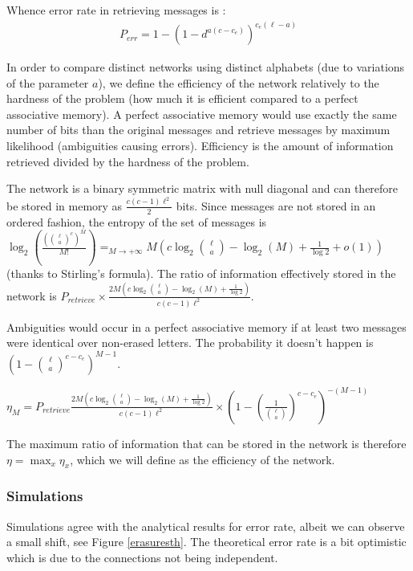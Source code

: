 \documentclass[english,10pt,twocolumn]{IEEEtran}
\theoremstyle{definition}
\begin{document}
	Whence error rate in retrieving messages is : 
	\begin{align}	
		P_{err} = 1 - \left(1 - d^	{a(c-c_e)}\right)^{c_e(\ell-a)} 
	\end{align}	 
	
	In order to compare distinct networks using distinct alphabets (due to variations of the parameter $a$), we define the efficiency of the network relatively to the hardness of the problem (how much it is efficient compared to a perfect associative memory). A perfect associative memory would use exactly the same number of bits than the original messages and retrieve messages by maximum likelihood (ambiguities causing errors). Efficiency is the amount of information retrieved divided by the hardness of the problem.
	
	The network is a binary symmetric matrix with null diagonal and can therefore be stored in memory as $\frac{c(c-1) \ell^2}{2}$ bits. Since messages are not stored in an ordered fashion, the entropy of the set of messages is $\log_2(\frac{({\ell \choose a}^c)^M}{M!}) \mathop{=}_{M \rightarrow +\infty} M(c \log_2{\ell \choose a } - \log_2(M) + \frac{1}{\log 2} + o(1)) $ (thanks to  Stirling's formula). The ratio of information effectively stored in the network is $P_{retrieve} \times  \frac{2M \left(c \log_2{\ell \choose a } - \log_2(M) + \frac{1}{\log 2} \right)}{c(c-1)\ell^2}$.
	
	Ambiguities would occur in a perfect associative memory if at least two messages were identical over non-erased letters. The probability it doesn't happen is $ (1-{\ell \choose a}^{c - c_e})^{M-1}$.
	
	
	$\eta_M = P_{retrieve}  \frac{2 M\left(c \log_2{\ell \choose a } - \log_2(M) + \frac{1}{\log 2} \right)}{c(c-1)\ell^2} \times (1-(\frac{1}{{\ell \choose a}})^{c - c_e})^{-(M-1)}$
	
	The maximum ratio of information that can be stored in the network is therefore $\eta = \max_x \eta_x $, which we will define as the efficiency of the network.
	
	\subsubsection{Simulations}
		
		
		Simulations agree with the analytical results for error rate, albeit we can observe a small shift, see Figure \ref{erasuresth}. The theoretical error rate is a bit optimistic which is due to the connections not being independent.
		
\end{document}
